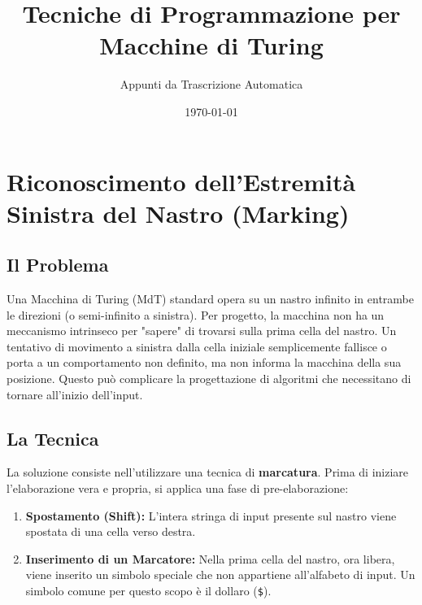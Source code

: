 \documentclass[a4paper]{article}
\title{Tecniche di Programmazione per Macchine di Turing}
\author{Appunti da Trascrizione Automatica}
\date{\today}
\theoremstyle{definition} %
\begin{document}
\maketitle
\tableofcontents
\newpage

\section{Riconoscimento dell'Estremità Sinistra del Nastro (Marking)}

\subsection{Il Problema}
Una Macchina di Turing (MdT) standard opera su un nastro infinito in entrambe le direzioni (o semi-infinito a sinistra). Per progetto, la macchina non ha un meccanismo intrinseco per "sapere" di trovarsi sulla prima cella del nastro. Un tentativo di movimento a sinistra dalla cella iniziale semplicemente fallisce o porta a un comportamento non definito, ma non informa la macchina della sua posizione. Questo può complicare la progettazione di algoritmi che necessitano di tornare all'inizio dell'input.

\subsection{La Tecnica}
La soluzione consiste nell'utilizzare una tecnica di \textbf{marcatura}. Prima di iniziare l'elaborazione vera e propria, si applica una fase di pre-elaborazione:
\begin{enumerate}
    \item \textbf{Spostamento (Shift):} L'intera stringa di input presente sul nastro viene spostata di una cella verso destra.
    \item \textbf{Inserimento di un Marcatore:} Nella prima cella del nastro, ora libera, viene inserito un simbolo speciale che non appartiene all'alfabeto di input. Un simbolo comune per questo scopo è il dollaro (\texttt{\$}).
\end{enumerate}
\end{document}
